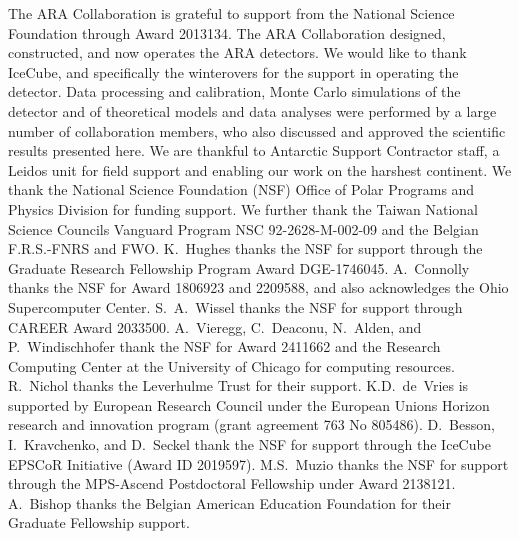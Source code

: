 \noindent
The ARA Collaboration is grateful to support from the National Science Foundation through Award 2013134.
The ARA Collaboration designed, constructed, and now operates the ARA detectors. 
We would like to thank IceCube, and specifically the winterovers for the support in operating the detector. 
Data processing and calibration, Monte Carlo simulations of the detector and of theoretical models and data analyses were performed by a large number
of collaboration members, who also discussed and approved the scientific results presented here. 
We are thankful to Antarctic Support Contractor staff, a Leidos unit for field support and enabling our work on the harshest continent. 
We thank the National Science Foundation (NSF) Office of Polar Programs and Physics Division for funding support. 
We further thank the Taiwan National Science Councils Vanguard Program NSC 92-2628-M-002-09 and the Belgian F.R.S.-FNRS and FWO.
K.~Hughes thanks the NSF for support through the Graduate Research Fellowship Program Award DGE-1746045. 
A.~Connolly thanks the NSF for Award 1806923 and 2209588, and also acknowledges the Ohio Supercomputer Center. 
S.~A.~Wissel thanks the NSF for support through CAREER Award 2033500.
A.~Vieregg, C.~Deaconu, N.~Alden, and P.~Windischhofer thank the NSF for Award 2411662 and the Research Computing Center at the University of Chicago
for computing resources.
R.~Nichol thanks the Leverhulme Trust for their support. 
K.D.~de~Vries is supported by European Research Council under the European Unions Horizon research and innovation program (grant agreement 763 No 805486). 
D.~Besson, I.~Kravchenko, and D.~Seckel thank the NSF for support through the IceCube EPSCoR Initiative (Award ID 2019597). 
M.S.~Muzio thanks the NSF for support through the MPS-Ascend Postdoctoral Fellowship under Award 2138121. 
A.~Bishop thanks the Belgian American Education Foundation for their Graduate Fellowship support.
